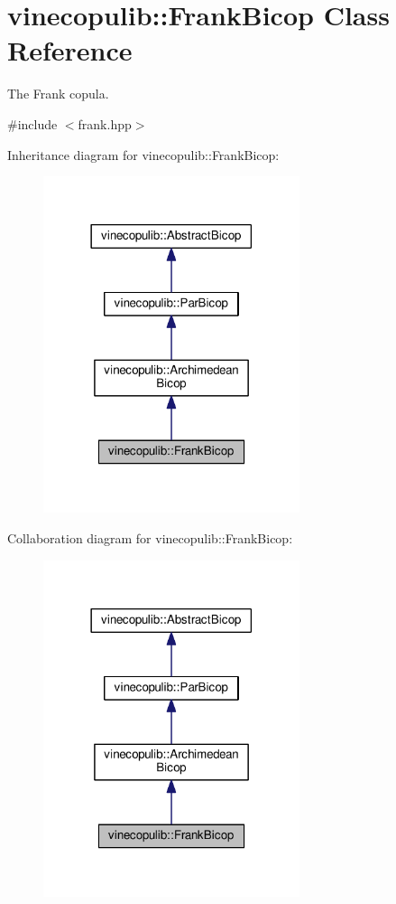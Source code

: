 \hypertarget{classvinecopulib_1_1_frank_bicop}{}\section{vinecopulib\+:\+:Frank\+Bicop Class Reference}
\label{classvinecopulib_1_1_frank_bicop}


The Frank copula.  




{\ttfamily \#include $<$frank.\+hpp$>$}



Inheritance diagram for vinecopulib\+:\+:Frank\+Bicop\+:\nopagebreak
\begin{figure}[H]
\begin{center}
\leavevmode
\includegraphics[width=213pt]{classvinecopulib_1_1_frank_bicop__inherit__graph}
\end{center}
\end{figure}


Collaboration diagram for vinecopulib\+:\+:Frank\+Bicop\+:\nopagebreak
\begin{figure}[H]
\begin{center}
\leavevmode
\includegraphics[width=213pt]{classvinecopulib_1_1_frank_bicop__coll__graph}
\end{center}
\end{figure}
